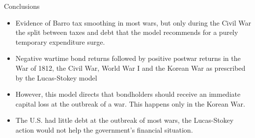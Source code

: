\documentclass[11pt,xcolor={dvipsnames},hyperref={pdftex,pdfpagemode=UseNone,hidelinks,pdfdisplaydoctitle=true},usepdftitle=false]{beamer}
\begin{document}
    \begin{frame}{Conclusions}
        
     \begin{itemize}
    \item  Evidence of Barro tax smoothing in most wars, but only during the Civil War the split between taxes and debt that the model recommends for a purely temporary expenditure
surge. 
    \item Negative wartime bond returns followed by positive postwar returns in the
War of 1812, the Civil War, World War I and the Korean War as prescribed by the Lucas-Stokey
model 
    \item However, this model directs that bondholders should receive an immediate capital loss
at the outbreak of a war. This happens  only in the Korean War. 
    \item The U.S. had little debt at the outbreak of most wars, the Lucas-Stokey
action would not help the government's financial situation.
     \end{itemize}

    \end{frame}
\end{document}
